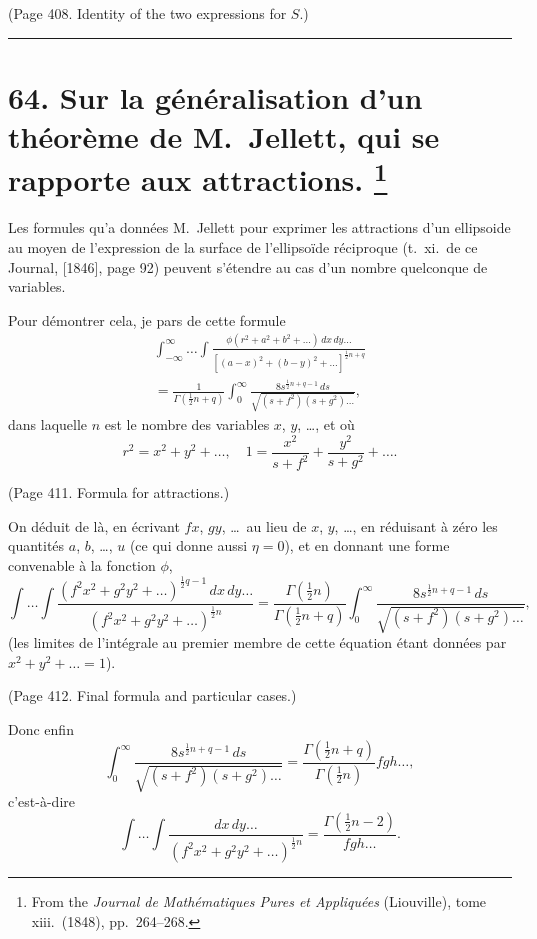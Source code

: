 \documentclass[11pt,a4paper]{article}
\theoremstyle{plain}
\theoremstyle{definition}
\begin{document}
(Page 408. Identity of the two expressions for $S$.)

\bigskip
\hrule
\bigskip

\newpage
\section[Sur la g\'{e}n\'{e}ralisation d'un th\'{e}or\`{e}me de M.~Jellett, qui se rapporte aux attractions]{%
64. Sur la g\'{e}n\'{e}ralisation d'un th\'{e}or\`{e}me de M.~Jellett, qui se rapporte aux attractions.%
\footnote{From the \textit{Journal de Math\'{e}matiques Pures et Appliqu\'{e}es} (Liouville), tome xiii.\ (1848), pp.~264--268.}}

Les formules qu'a donn\'{e}es M.~Jellett pour exprimer les attractions d'un ellipsoide
au moyen de l'expression de la surface de l'ellipso\"{i}de r\'{e}ciproque (t.~xi.\ de ce Journal,
[1846], page 92) peuvent s'\'{e}tendre au cas d'un nombre quelconque de variables.

Pour d\'{e}montrer cela, je pars de cette formule
\begin{multline*}
\int_{-\infty}^{\infty} \ldots \int \frac{\phi(r^2 + a^2 + b^2 + \ldots)\,dx\,dy\ldots}
{[(a-x)^2 + (b-y)^2 + \ldots]^{\frac{1}{2}n+q}} \\
= \frac{1}{\Gamma(\tfrac{1}{2}n + q)} \int_0^\infty \frac{8s^{\frac{1}{2}n+q-1}\,ds}{\sqrt{(s+f^2)(s+g^2)\ldots}}, \tag{1}
\end{multline*}
dans laquelle $n$ est le nombre des variables $x$, $y$, \ldots, et o\`{u}
\[
r^2 = x^2 + y^2 + \ldots, \quad 1 = \frac{x^2}{s+f^2} + \frac{y^2}{s+g^2} + \ldots. \tag{2}
\]

(Page 411. Formula for attractions.)

On d\'{e}duit de l\`{a}, en \'{e}crivant $fx$, $gy$, \ldots\ au lieu de $x$, $y$, \ldots, en r\'{e}duisant \`{a} z\'{e}ro les
quantit\'{e}s $a$, $b$, \ldots, $u$ (ce qui donne aussi $\eta = 0$), et en donnant une forme convenable
\`{a} la fonction $\phi$,
\[
\int \ldots \int \frac{(f^2x^2 + g^2y^2 + \ldots)^{\frac{1}{2}q-1}\,dx\,dy\ldots}
{(f^2x^2 + g^2y^2 + \ldots)^{\frac{1}{2}n}}
= \frac{\Gamma(\tfrac{1}{2}n)}{\Gamma(\tfrac{1}{2}n + q)} \int_0^\infty \frac{8s^{\frac{1}{2}n+q-1}\,ds}{\sqrt{(s+f^2)(s+g^2)\ldots}}, \tag{3}
\]
(les limites de l'int\'{e}grale au premier membre de cette \'{e}quation \'{e}tant donn\'{e}es par
$x^2 + y^2 + \ldots = 1$).

(Page 412. Final formula and particular cases.)

Donc enfin
\[
\int_0^\infty \frac{8s^{\frac{1}{2}n+q-1}\,ds}{\sqrt{(s+f^2)(s+g^2)\ldots}}
= \frac{\Gamma(\tfrac{1}{2}n+q)}{\Gamma(\tfrac{1}{2}n)} fgh\ldots, \tag{11}
\]
c'est-\`{a}-dire
\[
\int \ldots \int \frac{dx\,dy\ldots}{(f^2x^2 + g^2y^2 + \ldots)^{\frac{1}{2}n}}
= \frac{\Gamma(\tfrac{1}{2}n-2)}{fgh\ldots}. \tag{12}
\]
\end{document}
